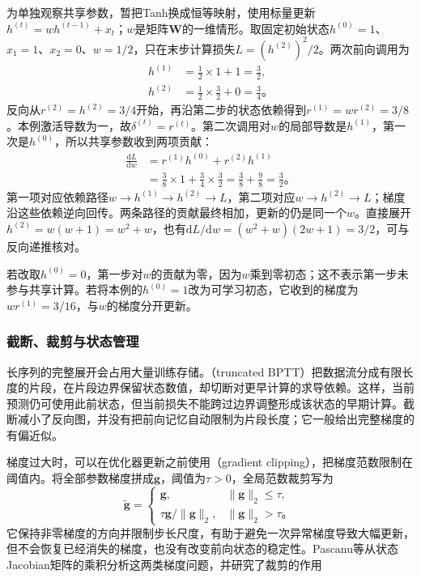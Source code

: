 \begin{example}[两步递推中的梯度累积]
  \label{ex:rnn-shared-gradient}
  为单独观察共享参数，暂把Tanh换成恒等映射，使用标量更新$h^{(t)}=w h^{(t-1)}+x_t$；$w$是矩阵$\bm W$的一维情形。取固定初始状态$h^{(0)}=1$、$x_1=1$、$x_2=0$、$w=1/2$，只在末步计算损失$L=(h^{(2)})^2/2$。两次前向调用为
  \[
    \begin{aligned}
      h^{(1)}&=\tfrac12\times1+1=\tfrac32,\\
      h^{(2)}&=\tfrac12\times\tfrac32+0=\tfrac34\text{。}
    \end{aligned}
  \]
  反向从$r^{(2)}=h^{(2)}=3/4$开始，再沿第二步的状态依赖得到$r^{(1)}=w r^{(2)}=3/8$。本例激活导数为一，故$\delta^{(t)}=r^{(t)}$。第二次调用对$w$的局部导数是$h^{(1)}$，第一次是$h^{(0)}$，所以共享参数收到两项贡献：
  \[
    \begin{aligned}
      \frac{\mathrm dL}{\mathrm dw}
        &=r^{(1)}h^{(0)}+r^{(2)}h^{(1)}\\
        &=\tfrac38\times1+\tfrac34\times\tfrac32
          =\tfrac38+\tfrac98=\tfrac32\text{。}
    \end{aligned}
  \]
  第一项对应依赖路径$w\to h^{(1)}\to h^{(2)}\to L$，第二项对应$w\to h^{(2)}\to L$；梯度沿这些依赖逆向回传。两条路径的贡献最终相加，更新的仍是同一个$w$。直接展开$h^{(2)}=w(w+1)=w^2+w$，也有$\mathrm dL/\mathrm dw=(w^2+w)(2w+1)=3/2$，可与反向递推核对。

  若改取$h^{(0)}=0$，第一步对$w$的贡献为零，因为$w$乘到零初态；这不表示第一步未参与共享计算。若将本例的$h^{(0)}=1$改为可学习初态，它收到的梯度为$w r^{(1)}=3/16$，与$w$的梯度分开更新。
\end{example}

\subsubsection{截断、裁剪与状态管理}
\label{sec:rnn-truncation}

长序列的完整展开会占用大量训练存储。（truncated BPTT）把数据流分成有限长度的片段，在片段边界保留状态数值，却切断对更早计算的求导依赖。这样，当前预测仍可使用此前状态，但当前损失不能跨过边界调整形成该状态的早期计算。截断减小了反向图，并没有把前向记忆自动限制为片段长度；它一般给出完整梯度的有偏近似。

梯度过大时，可以在优化器更新之前使用（gradient clipping），把梯度范数限制在阈值内。将全部参数梯度拼成$\bm{g}$，阈值为$\tau>0$，全局范数裁剪写为
\begin{equation}
  \widetilde{\bm{g}}=
  \begin{cases}
    \bm{g},&\lVert\bm{g}\rVert_2\leq\tau,\\
    \tau\bm{g}/\lVert\bm{g}\rVert_2,&\lVert\bm{g}\rVert_2>\tau\text{。}
  \end{cases}
  \label{eq:rnn-gradient-clipping}
\end{equation}
它保持非零梯度的方向并限制步长尺度，有助于避免一次异常梯度导致大幅更新，但不会恢复已经消失的梯度，也没有改变前向状态的稳定性。Pascanu等从状态Jacobian矩阵的乘积分析这两类梯度问题，并研究了裁剪的作用

